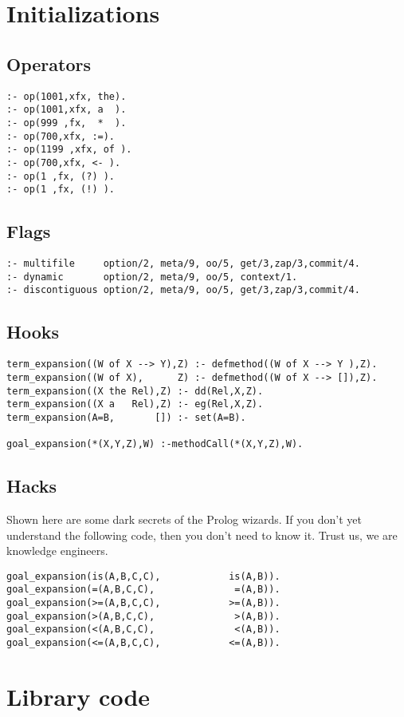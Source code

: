 \documentclass[twocolumn,10pt]{book}
\begin{document}
\section{ Initializations
}
\subsection{ Operators }\begin{Verbatim}
:- op(1001,xfx, the).
:- op(1001,xfx, a  ).
:- op(999 ,fx,  *  ).
:- op(700,xfx, :=).
:- op(1199 ,xfx, of ).
:- op(700,xfx, <- ).
:- op(1 ,fx, (?) ).
:- op(1 ,fx, (!) ).
\end{Verbatim}
\subsection{ Flags }\begin{Verbatim}
:- multifile     option/2, meta/9, oo/5, get/3,zap/3,commit/4.
:- dynamic       option/2, meta/9, oo/5, context/1.
:- discontiguous option/2, meta/9, oo/5, get/3,zap/3,commit/4.
\end{Verbatim}
\subsection{ Hooks }\begin{Verbatim}
term_expansion((W of X --> Y),Z) :- defmethod((W of X --> Y ),Z).
term_expansion((W of X),      Z) :- defmethod((W of X --> []),Z).
term_expansion((X the Rel),Z) :- dd(Rel,X,Z).
term_expansion((X a   Rel),Z) :- eg(Rel,X,Z).
term_expansion(A=B,       []) :- set(A=B).

goal_expansion(*(X,Y,Z),W) :-methodCall(*(X,Y,Z),W).
\end{Verbatim}
\subsection{ Hacks
}
 Shown here are some dark secrets of the Prolog
wizards. If you don't yet understand
the following code,
then you don't need to know it. Trust us,
we are knowledge engineers.  \begin{Verbatim}
goal_expansion(is(A,B,C,C),            is(A,B)).
goal_expansion(=(A,B,C,C),              =(A,B)).
goal_expansion(>=(A,B,C,C),            >=(A,B)).
goal_expansion(>(A,B,C,C),              >(A,B)).
goal_expansion(<(A,B,C,C),              <(A,B)).
goal_expansion(<=(A,B,C,C),            <=(A,B)).
\end{Verbatim}
\section{ Library code
}
\end{document}

